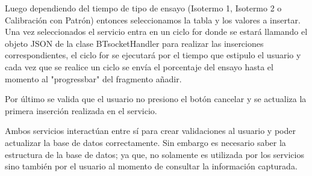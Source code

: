 \par \noindent
Luego dependiendo del tiempo de tipo de ensayo (Isotermo 1, Isotermo 2 o Calibración con Patrón) entonces seleccionamos la tabla y los valores a insertar. Una vez seleccionados el servicio entra en un ciclo for donde se estará llamando el objeto JSON de la clase BTsocketHandler para realizar las inserciones correspondientes, el ciclo for se ejecutará por el tiempo que estipulo el usuario y cada vez que se realice un ciclo se envía el porcentaje del ensayo hasta el momento al "progressbar" del fragmento añadir.

\par \noindent
Por último se valida que el usuario no presiono el botón cancelar y se actualiza la primera inserción realizada en el servicio.

\par \noindent
Ambos servicios interactúan entre sí para crear validaciones al usuario y poder actualizar la base de datos correctamente. Sin embargo es necesario saber la estructura de la base de datos; ya que, no solamente es utilizada por los servicios sino también por el usuario al momento de consultar la información capturada. 

\clearpage
